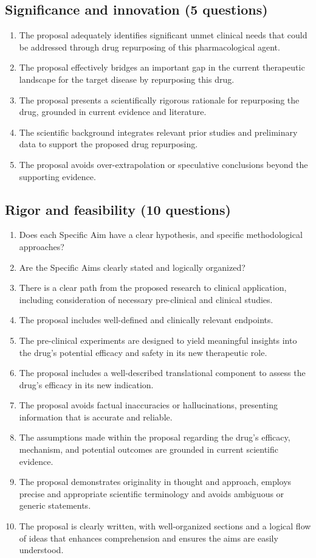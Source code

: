 \subsection*{Significance and innovation (5 questions)}
\begin{enumerate}
    \item The proposal adequately identifies significant unmet clinical needs that could be addressed through drug repurposing of this pharmacological agent.
    \item The proposal effectively bridges an important gap in the current therapeutic landscape for the target disease by repurposing this drug.
    \item The proposal presents a scientifically rigorous rationale for repurposing the drug, grounded in current evidence and literature.
    \item The scientific background integrates relevant prior studies and preliminary data to support the proposed drug repurposing.
    \item The proposal avoids over-extrapolation or speculative conclusions beyond the supporting evidence.
\end{enumerate}

\subsection*{Rigor and feasibility (10 questions)}
\begin{enumerate}
    \item Does each Specific Aim have a clear hypothesis, and specific methodological approaches?
    \item Are the Specific Aims clearly stated and logically organized?
    \item There is a clear path from the proposed research to clinical application, including consideration of necessary pre-clinical and clinical studies.
    \item The proposal includes well-defined and clinically relevant endpoints.
    \item The pre-clinical experiments are designed to yield meaningful insights into the drug's potential efficacy and safety in its new therapeutic role.
    \item The proposal includes a well-described translational component to assess the drug's efficacy in its new indication.
    \item The proposal avoids factual inaccuracies or hallucinations, presenting information that is accurate and reliable.
    \item The assumptions made within the proposal regarding the drug's efficacy, mechanism, and potential outcomes are grounded in current scientific evidence.
    \item The proposal demonstrates originality in thought and approach, employs precise and appropriate scientific terminology and avoids ambiguous or generic statements.
    \item The proposal is clearly written, with well-organized sections and a logical flow of ideas that enhances comprehension and ensures the aims are easily understood.
\end{enumerate}

